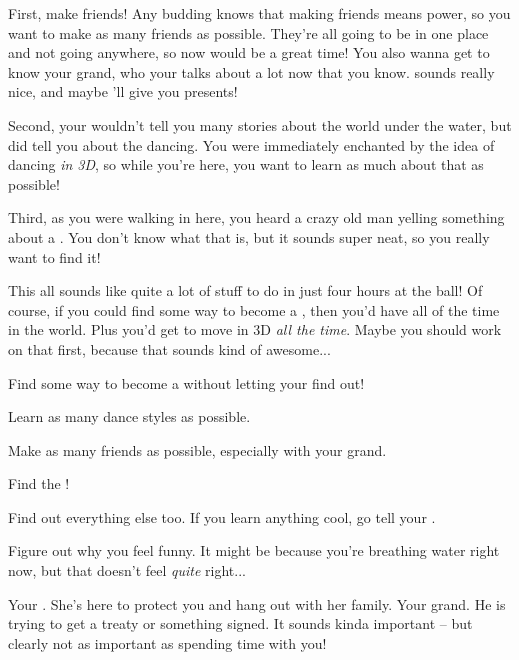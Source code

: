 \documentclass[char]{NeptuneBall}
\begin{document}
First, make friends! Any budding \cWillow{\prince} knows that making friends means power, so you want to make as many friends as possible. They're all going to be in one place and not going anywhere, so now would be a great time! You also wanna get to know your grand\cKing{\pa}, who your \cAriel{\pa} talks about a lot now that you know. \cKing{\They} sounds really nice, and maybe \cKing{\they}'ll give you presents!

Second, your \cAriel{\pa} wouldn't tell you many stories about the world under the water, but \cAriel{\they} did tell you about the dancing. You were immediately enchanted by the idea of dancing \emph{in 3D}, so while you're here, you want to learn as much about that as possible!

Third, as you were walking in here, you heard a crazy old man yelling something about a \iWishingStone{\MYname}. You don't know what that is, but it sounds super neat, so you really want to find it!

This all sounds like quite a lot of stuff to do in just four hours at the ball! Of course, if you could find some way to become a \cWillow{\mer}, then you'd have all of the time in the world. Plus you'd get to move in 3D \emph{all the time}. Maybe you should work on that first, because that sounds kind of awesome...

\begin{itemz}[Goals]
  \item Find some way to become a \cWillow{\mer} without letting your \cAriel{\parent} find out!
  \item Learn as many dance styles as possible.
  \item Make as many friends as possible, especially with your grand\cKing{\pa}.
	\item Find the \iWishingStone{\MYname}!
  \item Find out everything else too. If you learn anything cool, go tell your \cAriel{\parent}.
	\item Figure out why you feel funny. It might be because you're breathing water right now, but that doesn't feel \emph{quite} right...
\end{itemz}

\begin{contacts}
  \contact{\cAriel{}} Your \cAriel{\parent}. She's here to protect you and hang out with her family.
	\contact{\cKing{}} Your grand\cKing{\parent}. He is trying to get a treaty or something signed. It sounds kinda important -- but clearly not as important as spending time with you!
\end{contacts}
\end{document}
